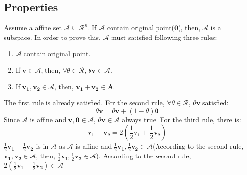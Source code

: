 \documentclass[10pt,a4paper]{article}
\begin{document}
\subsection{Properties}
Assume a affine set $\mathcal{A} \subseteq \mathcal{R}^{n}$. If $\mathcal{A}$ contain original point($\mathbf{0}$), then, $\mathcal{A}$ is a subspace. In order to prove this, $\mathcal{A}$ must satisfied following three rules:  
\begin{enumerate}
	\item $\mathcal{A}$ contain original point.
	\item If $\mathbf{v} \in \mathcal{A}$, then, $\forall \theta \in \mathcal{R}$, $\theta \mathbf{v} \in \mathcal{A}$.
	\item If $\mathbf{v_{1}}, \mathbf{v_{2}} \in \mathcal{A}$, then, $\mathbf{v_{1}} + \mathbf{v_{2}} \in \mathbf{A}$.
\end{enumerate}
The first rule is already satisfied. For the second rule, $\forall \theta \in \mathcal{R}$, $\theta \mathbf{v}$ satisfied:
\begin{equation*}
	\theta \mathbf{v} = \theta \mathbf{v} + (1 - \theta) \mathbf{0}
\end{equation*}
Since $\mathcal{A}$ is affine and $\mathbf{v}, \mathbf{0} \in \mathcal{A}$, $\theta \mathbf{v} \in \mathcal{A}$ always true. For the third rule, there is:
\begin{equation*}
	\mathbf{v_{1}} + \mathbf{v_{2}} = 2(\frac{1}{2} \mathbf{v_{1}} + \frac{1}{2} \mathbf{v_{2}})
\end{equation*}
$\frac{1}{2} \mathbf{v_{1}} + \frac{1}{2} \mathbf{v_{2}}$ is in $\mathcal{A}$ as $\mathcal{A}$ is affine and $\frac{1}{2} \mathbf{v_{1}}, \frac{1}{2} \mathbf{v_{2}} \in \mathcal{A}$(According to the second rule, $\mathbf{v_{1}}, \mathbf{v_{2}} \in \mathcal{A}$, then, $\frac{1}{2} \mathbf{v_{1}}, \frac{1}{2} \mathbf{v_{2}} \in \mathcal{A}$). According  to the second rule, $2(\frac{1}{2} \mathbf{v_{1}} + \frac{1}{2} \mathbf{v_{2}}) \in \mathcal{A}$
\end{document}
